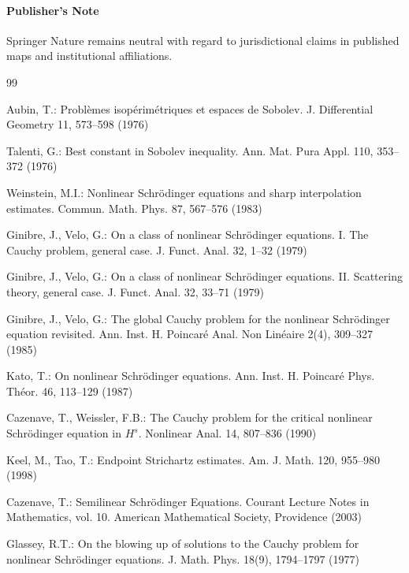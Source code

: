 \documentclass[smallextended,envcountsect,nospthms]{svjour3}
\numberwithin{equation}{section}
\theoremstyle{spbreak}
\theoremstyle{spdefbreak}
\theoremstyle{spdefbreak}
\begin{document}
\paragraph{Publisher's Note}
Springer Nature remains neutral with regard to jurisdictional claims in published maps and institutional affiliations.

\begingroup
\sloppy
{}
\begin{thebibliography}{99}

Aubin, T.: Probl\`emes isop\'erim\'etriques et espaces de Sobolev. J. Differential Geometry 11, 573--598 (1976)

Talenti, G.: Best constant in Sobolev inequality. Ann. Mat. Pura Appl. 110, 353--372 (1976)

Weinstein, M.I.: Nonlinear Schr\"odinger equations and sharp interpolation estimates. Commun. Math. Phys. 87, 567--576 (1983)

Ginibre, J., Velo, G.: On a class of nonlinear Schr\"odinger equations. I. The Cauchy problem, general case. J. Funct. Anal. 32, 1--32 (1979)

Ginibre, J., Velo, G.: On a class of nonlinear Schr\"odinger equations. II. Scattering theory, general case. J. Funct. Anal. 32, 33--71 (1979)

Ginibre, J., Velo, G.: The global Cauchy problem for the nonlinear Schr\"odinger equation revisited. Ann. Inst. H. Poincar\'e Anal. Non Lin\'eaire 2(4), 309--327 (1985)

Kato, T.: On nonlinear Schr\"odinger equations. Ann. Inst. H. Poincar\'e Phys. Th\'eor. 46, 113--129 (1987)

Cazenave, T., Weissler, F.B.: The Cauchy problem for the critical nonlinear Schr\"odinger equation in $H^s$. Nonlinear Anal. 14, 807--836 (1990)

Keel, M., Tao, T.: Endpoint Strichartz estimates. Am. J. Math. 120, 955--980 (1998)

Cazenave, T.: Semilinear Schr\"odinger Equations. Courant Lecture Notes in Mathematics, vol. 10. American Mathematical Society, Providence (2003)

Glassey, R.T.: On the blowing up of solutions to the Cauchy problem for nonlinear Schr\"odinger equations. J. Math. Phys. 18(9), 1794--1797 (1977)


\end{thebibliography}
\end{document}

